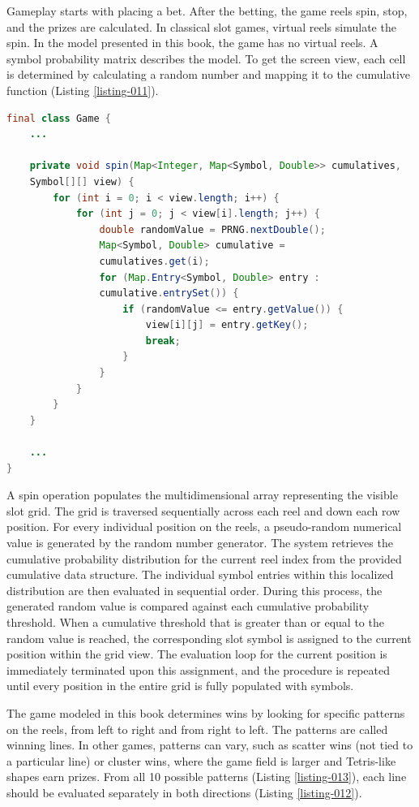 \documentclass[12pt,twoside,openany]{book}
\begin{document}
Gameplay starts with placing a bet. After the betting, the game reels spin, stop, and the prizes are calculated. In classical slot games, virtual reels simulate the spin. In the model presented in this book, the game has no virtual reels. A symbol probability matrix describes the model. To get the screen view, each cell is determined by calculating a random number and mapping it to the cumulative function (Listing \ref{listing-011}).

\begin{lstlisting}[language=Java, caption={Reels spin}, label=listing-011]
final class Game {
	...

	private void spin(Map<Integer, Map<Symbol, Double>> cumulatives, 
	Symbol[][] view) {
		for (int i = 0; i < view.length; i++) {
			for (int j = 0; j < view[i].length; j++) {
				double randomValue = PRNG.nextDouble();
				Map<Symbol, Double> cumulative = 
				cumulatives.get(i);
				for (Map.Entry<Symbol, Double> entry : 
				cumulative.entrySet()) {
					if (randomValue <= entry.getValue()) {
						view[i][j] = entry.getKey();
						break;
					}
				}
			}
		}
	}

	...
}
\end{lstlisting}

A spin operation populates the multidimensional array representing the visible slot grid. The grid is traversed sequentially across each reel and down each row position. For every individual position on the reels, a pseudo-random numerical value is generated by the random number generator. The system retrieves the cumulative probability distribution for the current reel index from the provided cumulative data structure. The individual symbol entries within this localized distribution are then evaluated in sequential order. During this process, the generated random value is compared against each cumulative probability threshold. When a cumulative threshold that is greater than or equal to the random value is reached, the corresponding slot symbol is assigned to the current position within the grid view. The evaluation loop for the current position is immediately terminated upon this assignment, and the procedure is repeated until every position in the entire grid is fully populated with symbols.

The game modeled in this book determines wins by looking for specific patterns on the reels, from left to right and from right to left. The patterns are called winning lines. In other games, patterns can vary, such as scatter wins (not tied to a particular line) or cluster wins, where the game field is larger and Tetris-like shapes earn prizes. From all 10 possible patterns (Listing \ref{listing-013}), each line should be evaluated separately in both directions (Listing \ref{listing-012}).
\end{document}
